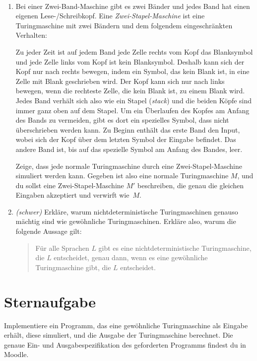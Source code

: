\documentclass{uebung_cs}
\begin{document}
\begin{aufgabe}[Turingmaschinen V]\
	\begin{enumerate}
		\item Bei einer Zwei-Band-Maschine gibt es zwei Bänder und jedes Band hat einen eigenen Lese-/Schreibkopf.
		Eine \emph{Zwei-Stapel-Maschine} ist eine Turingmaschine mit zwei Bändern und dem folgendem eingeschränkten Verhalten:
		
		Zu jeder Zeit ist auf jedem Band jede Zelle rechts vom Kopf das Blanksymbol und jede Zelle links vom Kopf ist kein Blanksymbol. Deshalb kann sich der Kopf nur nach rechts bewegen, indem ein Symbol, das kein Blank ist, in eine Zelle mit Blank geschrieben wird. Der Kopf kann sich nur nach links bewegen, wenn die rechteste Zelle, die kein Blank ist, zu einem Blank wird. Jedes Band verhält sich also wie ein Stapel (\emph{stack}) und die beiden Köpfe sind immer ganz oben auf dem Stapel. Um ein Überlaufen des Kopfes am Anfang des Bands zu vermeiden, gibt es dort ein spezielles Symbol, dass nicht überschrieben werden kann. Zu Beginn enthält das erste Band den Input, wobei sich der Kopf über dem letzten Symbol der Eingabe befindet. Das andere Band ist, bis auf das spezielle Symbol am Anfang des Bandes, leer.
		
		Zeige, dass jede normale Turingmaschine durch eine Zwei-Stapel-Maschine simuliert werden kann. Gegeben ist also eine normale Turingmaschine $M$, und du sollst eine Zwei-Stapel-Maschine $M'$ beschreiben, die genau die gleichen Eingaben akzeptiert und verwirft wie~$M$.
		
		\item \emph{(schwer)} Erkläre, warum nichtdeterministische Turingmaschinen genauso mächtig sind wie gewöhnliche Turingmaschinen.
    Erkläre also, warum die folgende Aussage gilt:
		\begin{quote}
			Für alle Sprachen $L$ gibt es eine nichtdeterministische Turingmaschine, die $L$ entscheidet, genau dann, wenn es eine gewöhnliche Turingmaschine gibt, die $L$ entscheidet.
		\end{quote}
	\end{enumerate}
\end{aufgabe}


\section*{Sternaufgabe}

\begin{aufgabe}[\emoji{star}: Turingmaschine simulieren (Coderunner)]
  Implementiere ein Programm, das eine gewöhnliche Turingmaschine als Eingabe erhält, diese simuliert, und die Ausgabe der Turingmaschine berechnet. Die genaue Ein- und Ausgabespezifikation des geforderten Programms findest du in Moodle.
\end{aufgabe}
\end{document}
